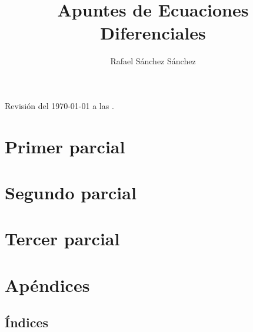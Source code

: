 \documentclass{book}
\title{Apuntes de Ecuaciones Diferenciales}
\author{Rafael S\'{a}nchez S\'{a}nchez}
\newcommand{\0}{\mathbf{0}}
\newcommand{\1}{\mathbf{1}}
\begin{document}
\begin{titlepage}
	
\end{titlepage}


Revisión del \today $ $ a las \currenttime.

\begin{center}

\end{center}

\tableofcontents

\part{Primer parcial}



\part{Segundo parcial}


\part{Tercer parcial}

\part{Ap\'{e}ndices}


%

\chapter{\'{I}ndices}

\renewcommand{\listtheoremname}{Lista de definiciones}
\listoftheorems[ignore={thm,eg,pro,cor,obs,lm,ex,th_ex}]

\renewcommand{\listtheoremname}{Lista de teoremas}
\listoftheorems[onlynamed,ignore={dfn,eg,cor,obs,lm,ex,th_ex}]

\renewcommand{\listtheoremname}{Lista de ejemplos}
\listoftheorems[onlynamed,ignore={dfn,thm,pro,cor,obs,lm,ex,th_ex}]

\renewcommand{\listtheoremname}{Lista de ejercicios}
\listoftheorems[ignore={dfn,thm,pro,cor,obs,lm,eg}]

\printglossaries



\end{document}
